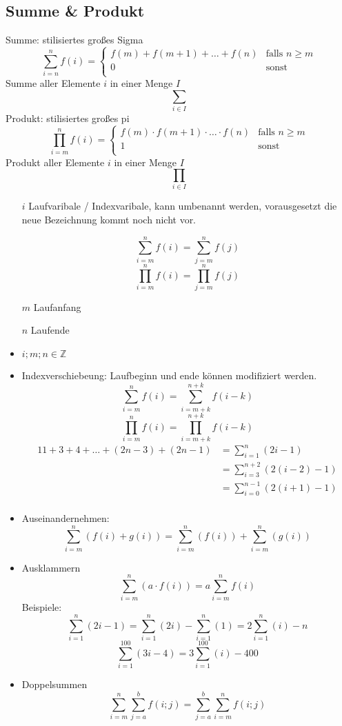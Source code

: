 \documentclass[12pt,a4paper]{article}
\begin{document}
\subsection{Summe \& Produkt}
Summe: stilisiertes großes Sigma
$$\sum\limits_{i = n}^n f(i) = \left \lbrace \begin{array}{ll}
		f(m) + f(m + 1) + \dots + f(n) & \textrm{falls } n \geq m \\
		0                              & \textrm{sonst}           \\
	\end{array} \right.$$
Summe aller Elemente $i$ in einer Menge $I$
$$\sum\limits_{i \in I}$$
Produkt: stilisiertes großes pi
$$\prod\limits_{i=m}^{n} f(i) = \left \lbrace \begin{array}{ll}
		f(m) \cdot f(m + 1) \cdot \dots \cdot f(n) & \textrm{falls } n \geq m \\
		1                                          & \textrm{sonst}           \\
	\end{array} \right.$$
Produkt aller Elemente $i$ in einer Menge $I$
$$\prod\limits_{i \in I}$$
\begin{itemize}
	\item[$i$] Laufvaribale / Indexvaribale, kann umbenannt werden, vorausgesetzt die neue Bezeichnung kommt noch nicht vor.
	\item[] $$\sum\limits_{i = m}^n f(i) = \sum\limits_{j = m}^n f(j)$$
		$$\prod\limits_{i = m}^n f(i) = \prod\limits_{j = m}^n f(j)$$
	\item[$m$] Laufanfang
	\item[$n$] Laufende
	\item $i;m;n \in \mathbb{Z}$
	\item Indexverschiebeung: Laufbeginn und ende können modifiziert werden.
	      $$\sum\limits_{i=m}^n f(i) = \sum\limits_{i=m+k}^{n+k} f(i-k)$$
	      $$\prod\limits_{i=m}^n f(i) = \prod\limits_{i=m+k}^{n+k} f(i-k)$$
	      \begin{alignat*}{1}
		      1+3+4+\dots+(2n-3)+(2n-1) & = \sum\limits_{i = 1}^n (2i-1)             \\
		                                & = \sum\limits_{i = 3}^{n + 2} (2(i - 2)-1) \\
		                                & = \sum\limits_{i = 0}^{n - 1} (2(i + 1)-1) \\
	      \end{alignat*}
	\item Auseinandernehmen:
	      $$\sum\limits_{i=m}^n (f(i) + g(i)) = \sum\limits_{i=m}^n (f(i)) + \sum\limits_{i=m}^n (g(i))$$
	\item Ausklammern
	      $$\sum\limits_{i=m}^n (a \cdot f(i)) = a \sum\limits_{i=m}^n f(i)$$
	      Beispiele:
	      $$\sum\limits_{i=1}^n (2i-1) = \sum\limits_{i=1}^n (2i) - \sum\limits_{i=1}^n (1) = 2\sum\limits_{i=1}^n (i) - n$$
	      $$\sum\limits_{i=1}^{100} (3i-4) = 3\sum\limits_{i=1}^{100} (i) - 400$$
	\item Doppelsummen
	      $$\sum\limits_{i=m}^n \sum\limits_{j=a}^b f(i; j) = \sum\limits_{j=a}^b \sum\limits_{i=m}^n f(i; j)$$
\end{itemize}
\end{document}
